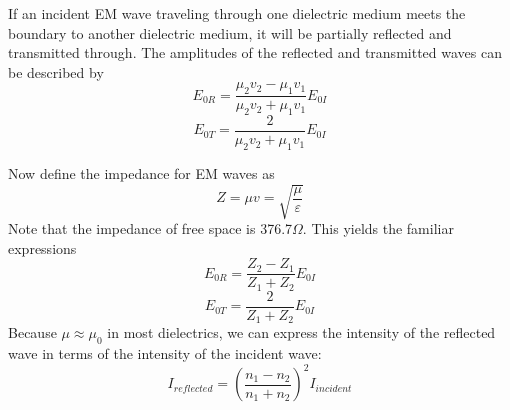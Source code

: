 \documentclass[11pt]{article}
\begin{document}
	If an incident EM wave traveling through one dielectric medium meets the boundary to another dielectric medium, it will be partially reflected and transmitted through. The amplitudes of the reflected and transmitted waves can be described by
	\begin{equation}
		E_{0R} = \frac{\mu_2 v_2 - \mu_1 v_1}{\mu_2 v_2 + \mu_1 v_1} E_{0I}
	\end{equation}
	\begin{equation}
		E_{0T} = \frac{2}{\mu_2 v_2 + \mu_1 v_1} E_{0I}
	\end{equation}
	
	Now define the impedance for EM waves as
	\begin{equation}
		Z = \mu v = \sqrt{\frac{\mu}{\varepsilon}}
	\end{equation}
	Note that the impedance of free space is 376.7$\Omega$. This yields the familiar expressions
	\begin{equation}
		E_{0R} = \frac{Z_2 - Z_1}{Z_1 + Z_2} E_{0I}
	\end{equation}
	\begin{equation}
		E_{0T} = \frac{2}{Z_1 + Z_2} E_{0I}
	\end{equation}
	Because $\mu \approx \mu_0$ in most dielectrics, we can express the intensity of the reflected wave in terms of the intensity of the incident wave:
	\begin{equation}
		I_{reflected} = \left( \frac{n_1 - n_2}{n_1 + n_2} \right)^2 I_{incident}
	\end{equation}
%		
%		


\end{document}
